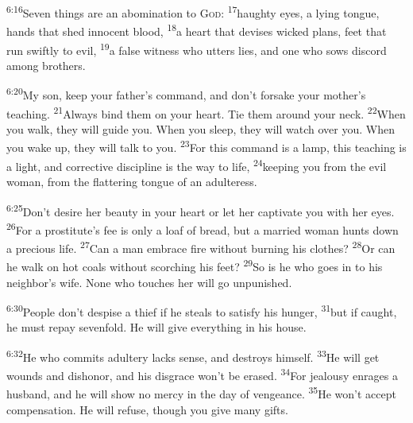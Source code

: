 \documentclass[openany,12pt,english]{book}
\newenvironment{para}{\par\pretolerance=100\tolerance=200\setlength{\emergencystretch}{0.6em}\relax}{\par}
\begin{document}
\begin{para}
    \textsuperscript{6:16}\thinspace{}Sev\-en things are an a\-bom\-i\-na\-tion to \textsc{God}:
    \textsuperscript{17}\thinspace{}haugh\-ty eyes, a ly\-ing tongue, hands that shed in\-no\-cent blood,
    \textsuperscript{18}\thinspace{}a heart that devises wick\-ed plans, feet that run swift\-ly to evil,
    \textsuperscript{19}\thinspace{}a false wit\-ness who utters lies, and one who sows dis\-cord a\-mong brothers.
\end{para}

\begin{para}
    \textsuperscript{6:20}\thinspace{}My son, keep your father's com\-mand, and don't for\-sake your mother's teach\-ing.
    \textsuperscript{21}\thinspace{}Al\-ways bind them on your heart. Tie them a\-round your neck.
    \textsuperscript{22}\thinspace{}When you walk, they will guide you. When you sleep, they will watch o\-ver you. When you wake up, they will talk to you.
    \textsuperscript{23}\thinspace{}For this com\-mand is a lamp, this teach\-ing is a light, and cor\-rec\-tive dis\-ci\-pline is the way to life,
    \textsuperscript{24}\thinspace{}keep\-ing you from the evil wom\-an, from the flattering tongue of an a\-dul\-ter\-ess.
\end{para}

\begin{para}
    \textsuperscript{6:25}\thinspace{}Don't de\-sire her beau\-ty in your heart or let her cap\-ti\-vate you with her eyes.
    \textsuperscript{26}\thinspace{}For a prostitute's fee is on\-ly a loaf of bread, but a mar\-ried wom\-an hunts down a pre\-cious life.
    \textsuperscript{27}\thinspace{}Can a man em\-brace fire with\-out burn\-ing his clothes?
    \textsuperscript{28}\thinspace{}Or can he walk on hot coals with\-out scorching his feet?
    \textsuperscript{29}\thinspace{}So is he who goes in to his neighbor's wife. None who touches her will go un\-pun\-ished.
\end{para}

\begin{para}
    \textsuperscript{6:30}\thinspace{}Peo\-ple don't des\-pise a thief if he steals to sat\-is\-fy his hun\-ger,
    \textsuperscript{31}\thinspace{}but if caught, he must re\-pay sev\-en\-fold. He will give eve\-ry\-thing in his house.
\end{para}

\begin{para}
    \textsuperscript{6:32}\thinspace{}He who commits a\-dul\-ter\-y lacks sense, and destroys him\-self.
    \textsuperscript{33}\thinspace{}He will get wounds and dis\-hon\-or, and his dis\-grace won't be e\-rased.
    \textsuperscript{34}\thinspace{}For jeal\-ous\-y enrages a hus\-band, and he will show no mer\-cy in the day of venge\-ance.
    \textsuperscript{35}\thinspace{}He won't ac\-cept com\-pen\-sa\-tion. He will ref\-use, though you give man\-y gifts.
\end{para}
\end{document}
